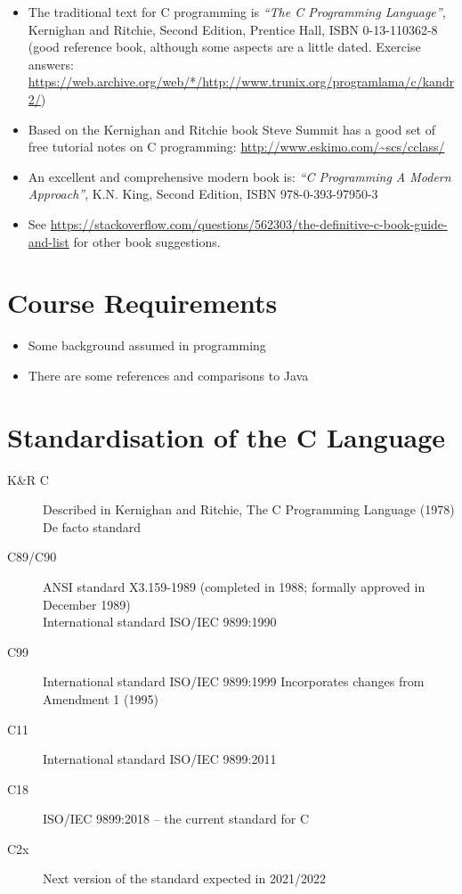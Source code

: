 \documentclass{article}
\begin{document}
\begin{itemize}
\item The traditional text for C programming is
\emph{``The C Programming Language''}, Kernighan and Ritchie, Second Edition, Prentice Hall, ISBN 0-13-110362-8
(good reference book, although some aspects are a little dated. Exercise answers: \url{https://web.archive.org/web/*/http://www.trunix.org/programlama/c/kandr2/})

\item Based on the Kernighan and Ritchie book Steve Summit has a good set of free tutorial notes on C programming: \url{http://www.eskimo.com/~scs/cclass/}

\item An excellent and comprehensive modern book is: 
\emph{``C Programming A Modern Approach''}, K.N. King, Second Edition, ISBN 978-0-393-97950-3

\item See \url{https://stackoverflow.com/questions/562303/the-definitive-c-book-guide-and-list} for other book suggestions.
\end{itemize}



\section{Course Requirements}
\begin{itemize}
\item Some background assumed in programming
\item There are some references and comparisons to Java
\end{itemize}



\section{Standardisation of the C Language}
\begin{description}
\item[K\&R C]
Described in Kernighan and Ritchie, The C Programming Language (1978)
De facto standard
\item[C89/C90] ANSI standard X3.159-1989 (completed in 1988; formally approved in December 1989)\\
International standard ISO/IEC 9899:1990
\item[C99] International standard ISO/IEC 9899:1999 Incorporates changes from Amendment 1 (1995)
\item[C11] International standard ISO/IEC 9899:2011
\item[C18] ISO/IEC 9899:2018 -- the current standard for C
\item[C2x] Next version of the standard expected in 2021/2022
\end{description}
\end{document}
